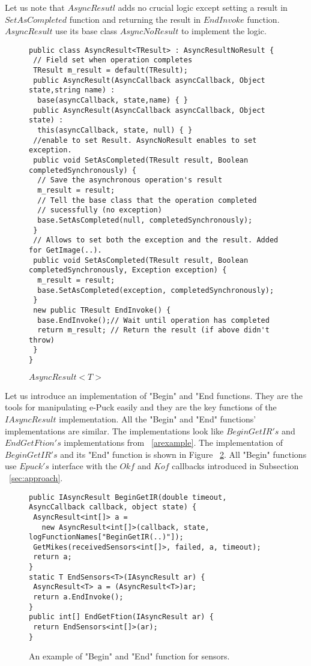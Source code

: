 	Let us note that $AsyncResutl$ adds no crucial logic except setting a result in $SetAsCompleted$ function and
	returning the result in $EndInvoke$ function. 
	$AsyncResult$ use its base class $AsyncNoResult$ to implement the logic.
\begin{figure}[!hbp]
\begin{lstlisting}
public class AsyncResult<TResult> : AsyncResultNoResult {
 // Field set when operation completes
 TResult m_result = default(TResult);
 public AsyncResult(AsyncCallback asyncCallback, Object state,string name) : 
  base(asyncCallback, state,name) { }
 public AsyncResult(AsyncCallback asyncCallback, Object state) : 
  this(asyncCallback, state, null) { }
 //enable to set Result. AsyncNoResult enables to set exception.
 public void SetAsCompleted(TResult result, Boolean completedSynchronously) {
  // Save the asynchronous operation's result
  m_result = result;
  // Tell the base class that the operation completed 
  // sucessfully (no exception)
  base.SetAsCompleted(null, completedSynchronously);
 }
 // Allows to set both the exception and the result. Added for GetImage(..).
 public void SetAsCompleted(TResult result, Boolean completedSynchronously, Exception exception) {
  m_result = result;
  base.SetAsCompleted(exception, completedSynchronously);
 }
 new public TResult EndInvoke() {
  base.EndInvoke();// Wait until operation has completed 
  return m_result; // Return the result (if above didn't throw)
 }
}
\end{lstlisting}
\caption{$AsyncResult<T>$} \label{result}
\end{figure}

	Let us introduce an implementation of "Begin" and "End functions.
	They are the tools for manipulating e-Puck easily and they are the key functions of the $IAsyncResult$ implementation.
	All the "Begin" and "End" functions' implementations are similar. The implementations look like $BeginGetIR's$
	and $EndGetFtion's$ implementations from ~\ref{arexample}.
	The implementation of $BeginGetIR's$ and its "End" function is shown in Figure ~\ref{beginsens}.
	All "Begin" functions use $Epuck's$ interface with the $Okf$ and $Kof$ callbacks introduced
	in Subsection ~\ref{sec:approach}.	

\begin{figure}[!hbp]
\begin{lstlisting}
public IAsyncResult BeginGetIR(double timeout, AsyncCallback callback, object state) {
 AsyncResult<int[]> a = 
   new AsyncResult<int[]>(callback, state, logFunctionNames["BeginGetIR(..)"]);
 GetMikes(receivedSensors<int[]>, failed, a, timeout);
 return a;
}
static T EndSensors<T>(IAsyncResult ar) {
 AsyncResult<T> a = (AsyncResult<T>)ar;
 return a.EndInvoke();
}
public int[] EndGetFtion(IAsyncResult ar) { 
 return EndSensors<int[]>(ar); 
}
\end{lstlisting}	
\caption{An example of "Begin" and "End" function for sensors.}
\label{beginsens}
\end{figure}

